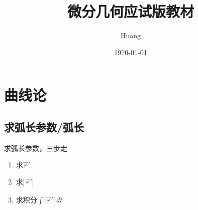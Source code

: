 \documentclass[lang=cn,10pt,thmcnt=section]{elegantbook}
\title{微分几何应试版教材}
\author{Huang}
\date{\today}
\begin{document}
	
	\maketitle
	\frontmatter
	
	\tableofcontents
	
	\mainmatter
	\chapter{曲线论}
	\section{求弧长参数/弧长}
	求弧长参数，三步走
	\begin{enumerate}
		\item 求$\overrightarrow{r} '$
		\item 求$\left\lvert \overrightarrow{r} '\right\rvert $
		\item 求积分$\int \left\lvert \overrightarrow{r} '\right\rvert \,dt $
	\end{enumerate}
\end{document}
